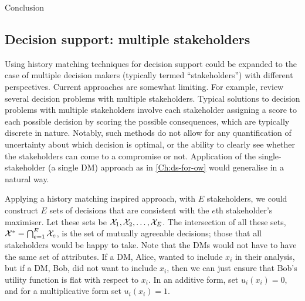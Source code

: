 \begin{chapter}{Conclusion \label{Ch:conclusions}}
\subsection{Decision support: multiple stakeholders}

Using history matching techniques for decision support could be expanded to the case of multiple decision makers (typically termed ``stakeholders'') with different perspectives. Current approaches are somewhat limiting. For example, \citet{Keller2009} review several decision problems with multiple stakeholders. Typical solutions to decision problems with multiple stakeholders involve each stakeholder assigning a score to each possible decision by scoring the possible consequences, which are typically discrete in nature. Notably, such methods do not allow for any quantification of uncertainty about which decision is optimal, or the ability to clearly see whether the stakeholders can come to a compromise or not. Application of the single-stakeholder (a single DM) approach as in \cref{Ch:ds-for-ow} would generalise in a natural way.

Applying a history matching inspired approach, with $E$ stakeholders, we could construct $E$ sets of decisions that are consistent with the $e$th stakeholder's maximiser. Let these sets be $\mathcal{X}_1,  \mathcal{X}_2, \ldots, \mathcal{X}_E$. The intersection of all these sets, $\mathcal{X}^{*} = \bigcap_{e = 1}^E \mathcal{X}_e$, is the set of mutually agreeable decisions; those that all stakeholders would be happy to take. Note that the DMs would not have to have the same set of attributes. If a DM, Alice, wanted to include $x_i$ in their analysis, but if a DM, Bob, did not want to include $x_i$, then we can just ensure that Bob's utility function is flat with respect to $x_i$. In an additive form, set $u_i(x_i)=0$, and for a multiplicative form set $u_i(x_i)=1$.


\end{chapter}
